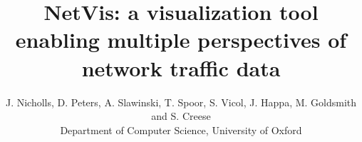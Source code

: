 
\title[NetVis Network Traffic Visualization]
      {NetVis: a visualization tool enabling multiple perspectives of network traffic data}

\author[Nicholls et al.]
       {J. Nicholls, D. Peters, A. Slawinski, T. Spoor, S. Vicol, J. Happa, M. Goldsmith and S. Creese
        \\
         Department of Computer Science, University of Oxford
       }

%
\addtolength{\parskip}{-0.25mm} %
